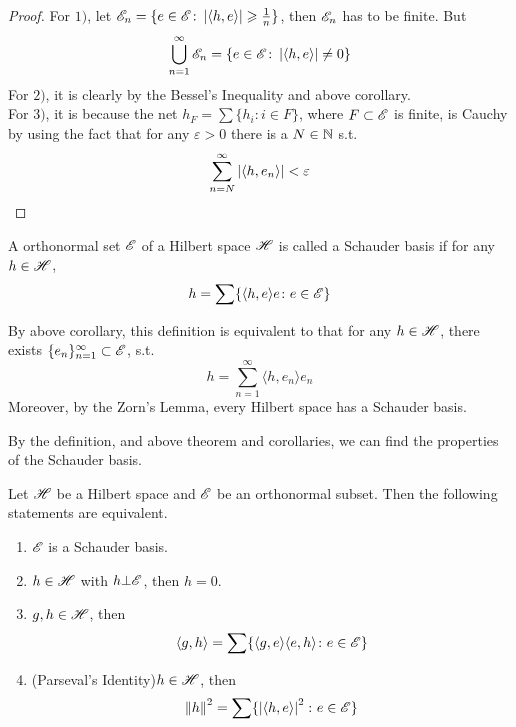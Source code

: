 \documentclass[a4paper,11pt]{report}
\begin{document}
\begin{proof}
	For $1)$, let $\mathscr{E}_n=\{e \in \mathscr{E} \colon \left\lvert \langle h,e \rangle \right\lvert \geqslant \frac{1}{n}\}$, then $\mathscr{E}_n$ has to be finite. But 
	\begin{equation*}
		\bigcup_{n=1}^{\infty} \mathscr{E}_n = \{e \in \mathscr{E} \colon \left\lvert \langle h,e \rangle \right\lvert \neq 0\}
	\end{equation*}
	For $2)$, it is clearly by the Bessel's Inequality and above corollary.\\
	For $3)$, it is because the net $h_F = \sum \{h_i \colon i \in F\}$, where $F \subset \mathscr{E}$ is finite, is Cauchy by using the fact that for any $\varepsilon  >  0$ there is a $N \in \mathbb{N}$ s.t. 
	\begin{equation*}
		\sum_{n=N}^{\infty} \left\lvert \langle h,e_n \rangle \right\lvert  <  \varepsilon
	\end{equation*}
\end{proof}

\begin{defn}
	A orthonormal set $\mathscr{E}$ of a Hilbert space $\mathscr{H}$ is called a Schauder basis if for any $h \in \mathscr{H}$,
	\begin{equation*}
		h = \sum \{ \langle h,e \rangle e \colon e \in \mathscr{E}\}
	\end{equation*}
\end{defn}
\begin{rem}
	By above corollary, this definition is equivalent to that for any $h \in \mathscr{H}$, there exists $\{e_n\}_{n=1}^{\infty} \subset \mathscr{E}$, s.t.
	\begin{equation*}
		h = \sum_{n=1}^{\infty}  \langle h,e_n \rangle e_n
	\end{equation*}
	Moreover, by the Zorn's Lemma, every Hilbert space has a Schauder basis.
\end{rem}

By the definition, and above theorem and corollaries, we can find the properties of the Schauder basis.
\begin{thm}
	Let $\mathscr{H}$ be a Hilbert space and $\mathscr{E}$ be an orthonormal subset. Then the following statements are equivalent.
	\begin{enumerate}[label=\arabic*)]
		\item $\mathscr{E}$ is a Schauder basis.
		\item $h \in \mathscr{H}$ with $h \bot \mathscr{E}$, then $h=0$.
		\item $g,h \in \mathscr{H}$, then
			\begin{equation*}
				 \langle g,h \rangle  = \sum \{ \langle g,e \rangle  \langle e,h \rangle  \colon e \in \mathscr{E}\}
			\end{equation*}
		\item (Parseval's Identity)$h \in \mathscr{H}$, then
			\begin{equation*}
				\left\lVert h\right\lVert^{2} = \sum \{\left\lvert \langle h,e \rangle \right\lvert^{2} \colon e \in \mathscr{E}\}
			\end{equation*}
	\end{enumerate}
\end{thm}
\end{document}
